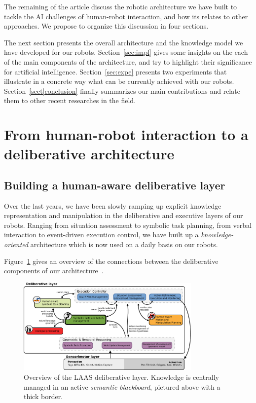 \documentclass[preprint,3p,times]{elsarticle}
\begin{document}
The remaining of the article discuss the robotic architecture we have built to
tackle the AI challenges of human-robot interaction, and how its relates to
other approaches. We propose to organize this discussion in four sections.

The next section presents the overall architecture and the knowledge model we
have developed for our robots. Section~\ref{sec:impl} gives some insights on
the each of the main components of the architecture, and try to highlight their
significance for artificial intelligence. Section~\ref{sec:expe} presents two
experiments that illustrate in a concrete way what can be currently achieved
with our robots.  Section~\ref{sect|conclusion} finally summarizes our main
contributions and relate them to other recent researches in the field.

\section{From human-robot interaction to a deliberative architecture}

\subsection{Building a human-aware deliberative layer}


Over the last years, we have been slowly ramping up explicit knowledge
representation and manipulation in the deliberative and executive layers of our
robots. Ranging from situation assessment to symbolic task planning, from
verbal interaction to event-driven execution control, we have built up a
\emph{knowledge-oriented} architecture which is now used on a daily basis on
our robots.


Figure~\ref{fig|archi} gives an overview of the connections between the
deliberative components of our architecture~\cite{Alami2011}.

\begin{figure}
        \centering
        \includegraphics[width=0.8\textwidth]{archi}
        \caption{Overview of the LAAS deliberative layer. Knowledge is
        centrally managed in an active \emph{semantic blackboard}, pictured
        above with a thick border.}
        \label{fig|archi}
\end{figure}
\end{document}
